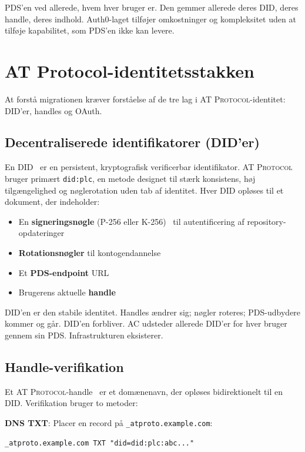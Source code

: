 \documentclass[10pt,letterpaper,twocolumn]{article}
\newcommand{\atproto}{\textsc{AT Protocol}}
\begin{document}
PDS'en ved allerede, hvem hver bruger er. Den gemmer allerede deres DID, deres handle, deres indhold. Auth0-laget tilføjer omkostninger og kompleksitet uden at tilføje kapabilitet, som PDS'en ikke kan levere.


\section{AT Protocol-identitetsstakken}
\label{sec:atproto}

At forstå migrationen kræver forståelse af de tre lag i \atproto{}-identitet: DID'er, handles og OAuth.

\subsection{Decentraliserede identifikatorer (DID'er)}

En DID~\citep{w3cdid2022, atproto2024did} er en persistent, kryptografisk verificerbar identifikator. \atproto{} bruger primært \texttt{did:plc}, en metode designet til stærk konsistens, høj tilgængelighed og nøglerotation uden tab af identitet. Hver DID opløses til et dokument, der indeholder:

\begin{itemize}
  \item En \textbf{signeringsnøgle} (P-256 eller K-256)~\citep{atproto2024crypto} til autentificering af repository-opdateringer
  \item \textbf{Rotationsnøgler} til kontogendannelse
  \item Et \textbf{PDS-endpoint} URL
  \item Brugerens aktuelle \textbf{handle}
\end{itemize}

DID'en er den stabile identitet. Handles ændrer sig; nøgler roteres; PDS-udbydere kommer og går. DID'en forbliver. AC udsteder allerede DID'er for hver bruger gennem sin PDS. Infrastrukturen eksisterer.

\subsection{Handle-verifikation}

Et \atproto{}-handle~\citep{atproto2024handle} er et domænenavn, der opløses bidirektionelt til en DID. Verifikation bruger to metoder:

\textbf{DNS TXT}: Placer en record på \texttt{\_atproto.example.com}:
\begin{lstlisting}
_atproto.example.com TXT "did=did:plc:abc..."
\end{lstlisting}
\end{document}
